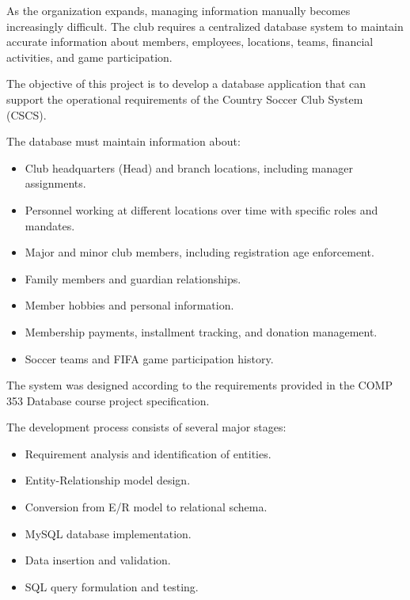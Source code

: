 \documentclass[11pt,a4paper]{article}
\begin{document}
As the organization expands, managing information manually becomes
increasingly difficult. The club requires a centralized database system
to maintain accurate information about members, employees, locations,
teams, financial activities, and game participation.


The objective of this project is to develop a database application that
can support the operational requirements of the Country Soccer Club
System (CSCS).


The database must maintain information about:


\begin{itemize}


\item Club headquarters (Head) and branch locations, including manager assignments.


\item Personnel working at different locations over time with specific roles and mandates.


\item Major and minor club members, including registration age enforcement.


\item Family members and guardian relationships.


\item Member hobbies and personal information.


\item Membership payments, installment tracking, and donation management.


\item Soccer teams and FIFA game participation history.


\end{itemize}



The system was designed according to the requirements provided in the
COMP 353 Database course project specification.


The development process consists of several major stages:


\begin{itemize}


\item Requirement analysis and identification of entities.


\item Entity-Relationship model design.


\item Conversion from E/R model to relational schema.


\item MySQL database implementation.


\item Data insertion and validation.


\item SQL query formulation and testing.


\end{itemize}
\end{document}
